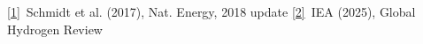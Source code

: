 \href{https://doi.org/10.1038/nenergy.2017.110}{[1]}~Schmidt et al. (2017), Nat. Energy, 2018 update\quad
\href{https://iea.blob.core.windows.net/assets/12d92ecc-e960-40f3-aff5-b2de6690ab6b/GlobalHydrogenReview2025.pdf}{[2]}~IEA (2025), Global Hydrogen Review

